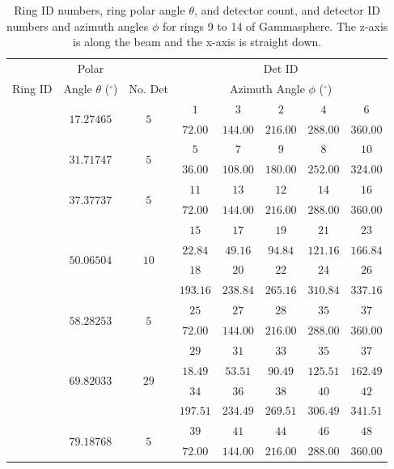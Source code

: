 \begin{table}
\label{tbl:chp3-gs-angles1}
\caption{Ring ID numbers, ring polar angle $\theta$, and detector count, and detector ID numbers and azimuth angles $\phi$ for rings 9 to 14 of Gammasphere. The z-axis is along the beam and the x-axis is straight down.}
\begin{tabular}{|c|c|c|c|c|c|c|c|}
\hline
\hline&Polar&&\multicolumn{5}{|c|}{Det ID}\\ 
Ring ID & Angle $\theta$ ($^{\circ}$) & No. Det&\multicolumn{5}{|c|}{Azimuth Angle $\phi$ ($^{\circ}$)}\\ 
\hline{}\multirow{2}{*}{$1$}&\multirow{2}{*}{$17.27465$}&\multirow{2}{*}{$5$}&$1$&$3$&$2$&$4$&$6$\\
&&&$72.00$&$144.00$&$216.00$&$288.00$&$360.00$\\ 
\hline{}\multirow{2}{*}{$2$}&\multirow{2}{*}{$31.71747$}&\multirow{2}{*}{$5$}&$5$&$7$&$9$&$8$&$10$\\
&&&$36.00$&$108.00$&$180.00$&$252.00$&$324.00$\\ 
\hline{}\multirow{2}{*}{$3$}&\multirow{2}{*}{$37.37737$}&\multirow{2}{*}{$5$}&$11$&$13$&$12$&$14$&$16$\\
&&&$72.00$&$144.00$&$216.00$&$288.00$&$360.00$\\ 
\hline{}\multirow{4}{*}{$4$}&\multirow{4}{*}{$50.06504$}&\multirow{4}{*}{$10$}&$15$&$17$&$19$&$21$&$23$\\
&&&$22.84$&$49.16$&$94.84$&$121.16$&$166.84$\\
\cline{4-8}&&&$18$&$20$&$22$&$24$&$26$\\
&&&$193.16$&$238.84$&$265.16$&$310.84$&$337.16$\\
\hline{}\multirow{2}{*}{$5$}&\multirow{2}{*}{$58.28253$}&\multirow{2}{*}{$5$}&$25$&$27$&$28$&$35$&$37$\\
&&&$72.00$&$144.00$&$216.00$&$288.00$&$360.00$\\ 
\hline{}\multirow{4}{*}{$6$}&\multirow{4}{*}{$69.82033$}&\multirow{4}{*}{$29$}&$29$&$31$&$33$&$35$&$37$\\
&&&$18.49$&$53.51$&$90.49$&$125.51$&$162.49$\\
\cline{4-8}&&&$34$&$36$&$38$&$40$&$42$\\
&&&$197.51$&$234.49$&$269.51$&$306.49$&$341.51$\\
\hline{}\multirow{2}{*}{$7$}&\multirow{2}{*}{$79.18768$}&\multirow{2}{*}{$5$}&$39$&$41$&$44$&$46$&$48$\\
&&&$72.00$&$144.00$&$216.00$&$288.00$&$360.00$\\ 
\hline
\hline
\end{tabular}
\end{table}

